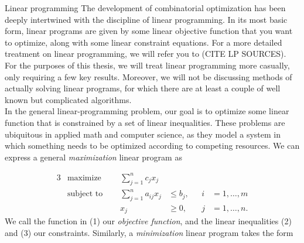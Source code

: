 \begin{section}{Linear programming}
	The development of combinatorial optimization has been deeply intertwined with the discipline 
	of linear programming. In its most basic form, linear programs are given by some linear 
	objective function that you want to optimize, along with some linear constraint equations. 
	For a more detailed treatment on linear programming, we will refer you to (CITE LP SOURCES).
	For the purposes of this thesis, we will treat linear programming more casually, only requiring 
	a few key results. Moreover, we will not be discussing methods of actually solving linear 
	programs, for which there are at least a couple of well known but complicated algorithms. \\
	In the general linear-programming problem, our goal is to optimize some linear function that 
	is constrained by a set of linear inequalities. These problems are ubiquitous in applied math 
	and computer science, as they model a system in which something needs to be optimized according 
	to competing resources. We can express a general \emph{maximization} linear program as

	\begin{alignat}{3}
		& \text{maximize } & \sum_{j=1}^{n} c_{j} x_{j}& \\
		& \text{subject to } \quad & \sum_{j=1}^{n} a_{ij} x_{j} & \leq b_{j}, & i & = 1, \dots 
		, m \\
				&& x_{j} & \geq 0, \quad & j & = 1, \dots, n.
	\end{alignat}
	We call the function in (1) our \emph{objective function}, and the linear inequalities (2) and 
	(3) our constraints. Similarly, a \emph{minimization} linear program takes the form


\end{section}
